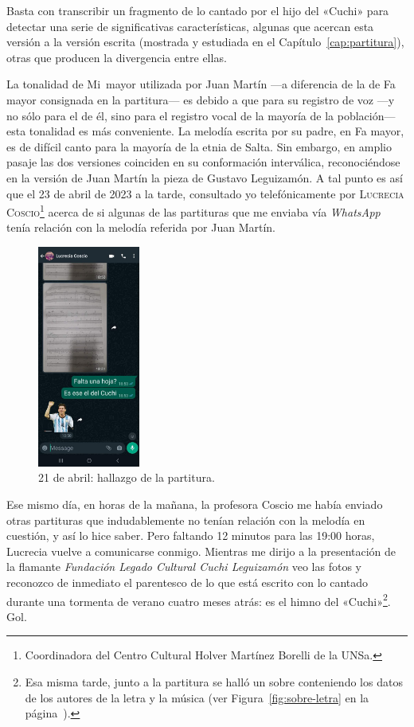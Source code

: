 Basta con transcribir un fragmento de lo cantado por el hijo del «Cuchi» para detectar una serie de significativas características, algunas que acercan esta versión a la versión escrita (mostrada y estudiada en el Capítulo~\ref{cap:partitura}), otras que producen la divergencia entre ellas.

La tonalidad de Mi\bemoltxt\ mayor utilizada por Juan Martín ---a diferencia de la de Fa mayor consignada en la partitura--- es debido a que para su registro de voz ---y no sólo para el de él, sino para el registro vocal de la mayoría de la población--- esta tonalidad es más conveniente. La melodía escrita por su padre, en Fa mayor, es de difícil canto para la mayoría de la etnia de Salta. Sin embargo, en amplio pasaje las dos versiones coinciden en su conformación interválica, reconociéndose en la versión de Juan Martín la pieza de Gustavo Leguizamón. A tal punto es así que el 23 de abril de 2023 a la tarde, consultado yo telefónicamente por \textsc{Lucrecia Coscio}\footnote{Coordinadora del Centro Cultural Holver Martínez Borelli de la UNSa.} acerca de si algunas de las partituras que me enviaba vía \emph{WhatsApp} tenía relación con la melodía referida por Juan Martín.

\begin{figure}[H]
\centering
\includegraphics[width=0.3\textwidth]{img/lucrecia1}
\caption{21 de abril: hallazgo de la partitura.}
\label{fig:hallazgo-partitura}
\end{figure}

\noindent Ese mismo día, en horas de la mañana, la profesora Coscio me había enviado otras partituras que indudablemente no tenían relación con la melodía en cuestión, y así lo hice saber. Pero faltando 12 minutos para las 19:00 horas, Lucrecia vuelve a comunicarse conmigo. Mientras me dirijo a la presentación de la flamante \emph{Fundación Legado Cultural Cuchi Leguizamón} veo las fotos y reconozco de inmediato el parentesco de lo que está escrito con lo cantado durante una tormenta de verano cuatro meses atrás: es el himno del «Cuchi»\footnote{Esa misma tarde, junto a la partitura se halló un sobre conteniendo los datos de los autores de la letra y la música (ver Figura~\ref{fig:sobre-letra} en la página~\pageref{fig:sobre-letra}).}. Gol.


